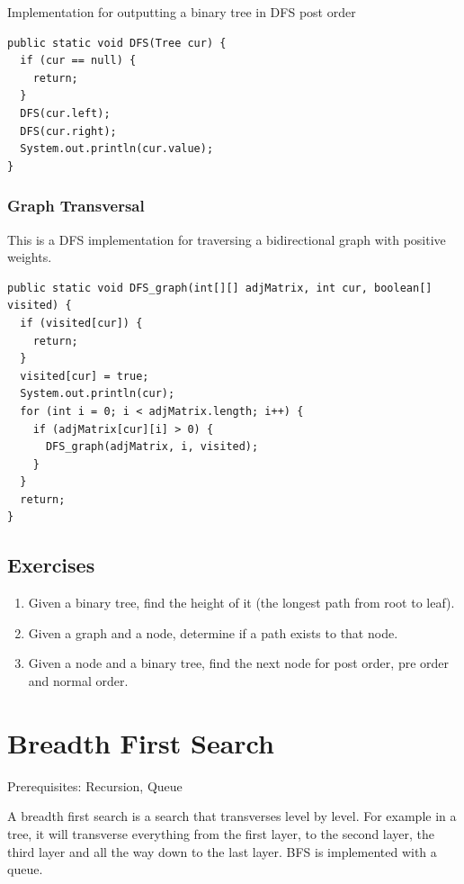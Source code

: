 \documentclass[11pt,oneside]{book}
\begin{document}
Implementation for outputting a binary tree in DFS post order

\begin{lstlisting}
public static void DFS(Tree cur) {
  if (cur == null) {
    return;
  }
  DFS(cur.left);
  DFS(cur.right);
  System.out.println(cur.value);
}
\end{lstlisting}

\subsubsection{Graph Transversal}

This is a DFS implementation for traversing a bidirectional graph with positive weights.

\begin{lstlisting}
public static void DFS_graph(int[][] adjMatrix, int cur, boolean[] visited) {
  if (visited[cur]) {
    return;
  }
  visited[cur] = true;
  System.out.println(cur);
  for (int i = 0; i < adjMatrix.length; i++) {
    if (adjMatrix[cur][i] > 0) {
      DFS_graph(adjMatrix, i, visited);
    }
  }
  return;
}
\end{lstlisting}

\subsection{Exercises}

\begin{enumerate}
\item Given a binary tree, find the height of it (the longest path from root to leaf).
\item Given a graph and a node, determine if a path exists to that node.
\item Given a node and a binary tree, find the next node for post order, pre order and normal order.
\end{enumerate}

        \section{ Breadth First Search }
        

Prerequisites: Recursion, Queue

A breadth first search is a search that transverses level by level. For example in a tree, it will transverse everything from the first layer, to the second layer, the third layer and all the way down to the last layer. BFS is implemented with a queue.
\end{document}
